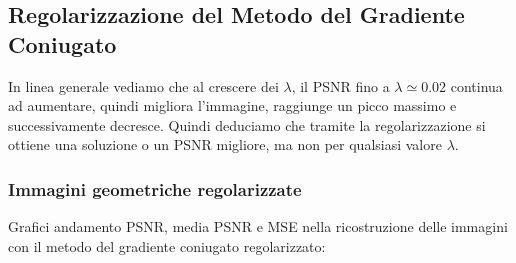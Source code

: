 {\color{ggreen}\subsection{Regolarizzazione del Metodo del Gradiente Coniugato }}
In linea generale vediamo che al crescere dei $\lambda$, il PSNR fino a $\lambda \simeq 0.02$ 
continua ad aumentare, 
quindi migliora l'immagine, raggiunge un picco massimo e successivamente decresce.
Quindi deduciamo che tramite la regolarizzazione si ottiene una soluzione o un PSNR migliore, ma non per 
qualsiasi valore $\lambda$. 

{\color{ggreen}\subsubsection{Immagini geometriche regolarizzate}}
Grafici andamento PSNR, media PSNR e MSE nella ricostruzione delle immagini con il metodo del gradiente coniugato regolarizzato:

